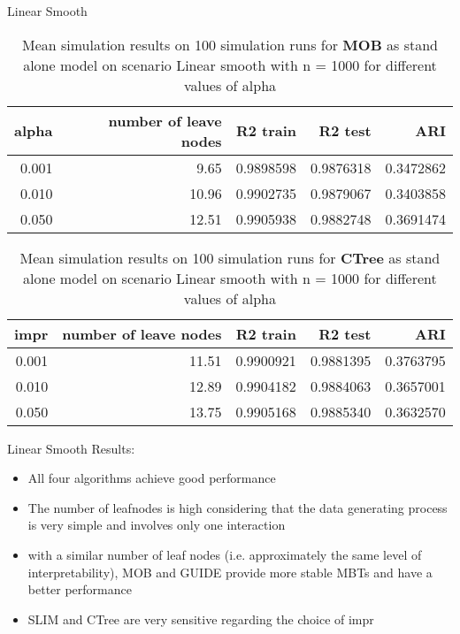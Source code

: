 \documentclass[9pt, xcolor=table]{beamer}
\begin{document}
\begin{frame}{Linear Smooth}
\begin{table}

\caption{Mean simulation results on 100 simulation runs for \textbf{MOB} as stand alone model on scenario Linear smooth with n = 1000 for different values of alpha}
\centering \small
\begin{tabular}[t]{r|r|r|r|r}
\hline
alpha & number of leave nodes & R2 train & R2 test & ARI\\
\hline
0.001 & 9.65 & 0.9898598 & 0.9876318 & 0.3472862\\
\hline
0.010 & 10.96 & 0.9902735 & 0.9879067 & 0.3403858\\
\hline
0.050 & 12.51 & 0.9905938 & 0.9882748 & 0.3691474\\
\hline
\end{tabular}
\end{table} 


\begin{table}

\caption{Mean simulation results on 100 simulation runs for \textbf{CTree} as stand alone model on scenario Linear smooth with n = 1000 for different values of alpha}
\centering \small
\begin{tabular}[t]{r|r|r|r|r}
\hline
impr & number of leave nodes & R2 train & R2 test & ARI\\
\hline
0.001 & 11.51 & 0.9900921 & 0.9881395 & 0.3763795\\
\hline
0.010 & 12.89 & 0.9904182 & 0.9884063 & 0.3657001\\
\hline
0.050 & 13.75 & 0.9905168 & 0.9885340 & 0.3632570\\
\hline
\end{tabular}
\end{table}
\end{frame}

\begin{frame}{Linear Smooth}
Results:
\begin{itemize}
    \item All four algorithms achieve good performance
    \item The number of leafnodes is high considering that the data generating process is very simple and involves only one interaction 
    \item with a similar number of leaf nodes (i.e. approximately the same level of interpretability), MOB and GUIDE provide more stable MBTs and have a better performance
    \item SLIM and CTree are very sensitive regarding the choice of impr
\end{itemize}
    
\end{frame}
\end{document}
